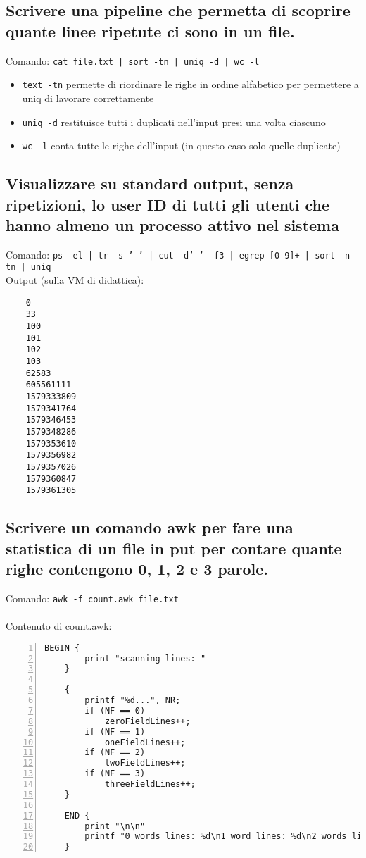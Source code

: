 \documentclass{article}
\begin{document}
\subsection{Scrivere una pipeline che permetta di scoprire quante linee ripetute ci sono in un file.}
Comando: \texttt{cat file.txt | sort -tn | uniq -d | wc -l}
\begin{itemize}
    \item \texttt{text -tn} permette di riordinare le righe in ordine alfabetico per permettere a uniq di lavorare correttamente
    \item \texttt{uniq -d} restituisce tutti i duplicati nell'input presi una volta ciascuno
    \item \texttt{wc -l} conta tutte le righe dell'input (in questo caso solo quelle duplicate)
\end{itemize}

\subsection{Visualizzare su standard output, senza ripetizioni, lo user ID di tutti gli utenti che hanno almeno un processo attivo nel sistema}
Comando: \texttt{ps -el | tr -s ' ' | cut -d' ' -f3 | egrep [0-9]+ | sort -n -tn | uniq}\\
Output (sulla VM di didattica):
\begin{verbatim}
    0
    33
    100
    101
    102
    103
    62583
    605561111
    1579333809
    1579341764
    1579346453
    1579348286
    1579353610
    1579356982
    1579357026
    1579360847
    1579361305
\end{verbatim}

\subsection{Scrivere un comando awk per fare una statistica di un file in put per contare quante righe contengono 0, 1, 2 e 3 parole.}
Comando: \texttt{awk -f count.awk file.txt}\\\\

Contenuto di count.awk:
\begin{lstlisting}[numbers=left]
    BEGIN {
        print "scanning lines: "
    }

    {
        printf "%d...", NR;
        if (NF == 0)
            zeroFieldLines++;
        if (NF == 1)
            oneFieldLines++;
        if (NF == 2)
            twoFieldLines++;
        if (NF == 3)
            threeFieldLines++;
    }

    END {
        print "\n\n"
        printf "0 words lines: %d\n1 word lines: %d\n2 words lines: %d\n3 words lines: %d\n", zeroFieldLines, oneFieldLines, twoFieldLines, threeFieldLines;
    }
\end{lstlisting}
\end{document}

